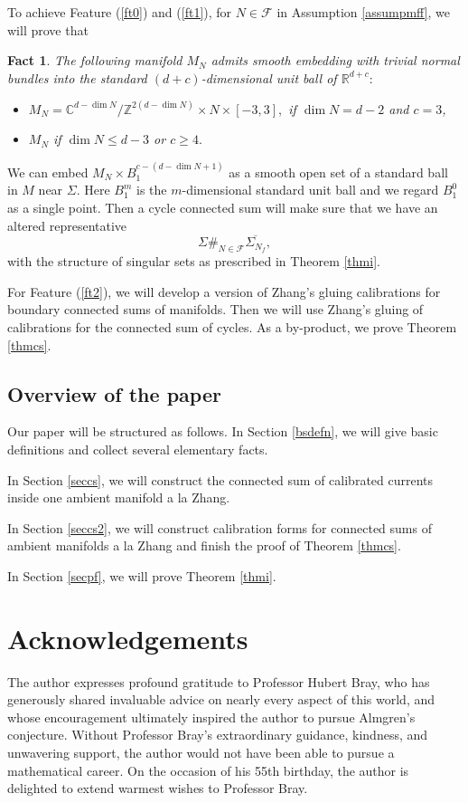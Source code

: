 \documentclass[11pt,a4paper]{amsart}
\numberwithin{equation}{section}
\newcommand{\Si}{\Sigma}
\newcommand{\ov}[1]{\overline{#1}}
\newcommand{\R}{\mathbb{R}}
\newcommand{\Z}{\mathbb{Z}}
\newcommand{\C}{\mathbb{C}}
\theoremstyle{plain}
\newtheorem{fact}[exam]{Fact}
\theoremstyle{definition}
\numberwithin{equation}{subsection}
\begin{document}
	To achieve Feature (\ref{ft0}) and (\ref{ft1}), for $N\in\mathcal{F}$ in Assumption \ref{assumpmff}, we will prove that 
	\begin{fact}\label{fctnk}The following manifold $M_N$ admits smooth embedding with trivial normal bundles into the standard $(d+c)$-dimensional unit ball of $\R^{d+c}:$
		\begin{itemize}
			\item	$
			M_N=\C^{d-\dim N}/\Z^{2(d-\dim N)}\times N\times [-3,3],
			$ if $\dim N=d-2$ and $c=3$,
			\item $M_N$ if $\dim N\le d-3$ or $c\ge 4.$
	\end{itemize}\end{fact}We can embed $M_N\times B_1^{c-(d-\dim N+1)}$ as a smooth open set of a standard ball in $M$ near $\Si$. Here $B_1^{m}$ is the $m$-dimensional standard unit ball and we regard $B_1^0$ as a single point. Then a cycle connected sum will make sure that we have an altered representative $$\Si\#_{N\in\mathcal{F}}\ov{\Si_{N_f}},$$with the structure of singular sets as prescribed in Theorem \ref{thmi}.
	
	For Feature (\ref{ft2}), we will develop a version of Zhang's gluing calibrations for boundary connected sums of manifolds. Then we will use Zhang's gluing of calibrations for the connected sum of cycles. As a by-product, we prove Theorem \ref{thmcs}.
	\subsection{Overview of the paper}
	Our paper will be structured as follows. 
	In Section \ref{bsdefn}, we will give basic definitions and collect several elementary facts.
	
	In Section \ref{seccs}, we will construct the connected sum of calibrated currents inside one ambient manifold a la Zhang.
	
	In Section \ref{seccs2}, we will construct calibration forms for connected sums of ambient manifolds a la Zhang and finish the proof of Theorem \ref{thmcs}.
	
	In Section \ref{secpf}, we will prove Theorem \ref{thmi}.
	\section*{Acknowledgements}
	The author expresses profound gratitude to Professor Hubert Bray, who has generously shared invaluable advice on nearly every aspect of this world, and whose encouragement ultimately inspired the author to pursue Almgren’s conjecture. Without Professor Bray’s extraordinary guidance, kindness, and unwavering support, the author would not have been able to pursue a mathematical career. On the occasion of his 55th birthday, the author is delighted to extend warmest wishes to Professor Bray.
	
\end{document}

